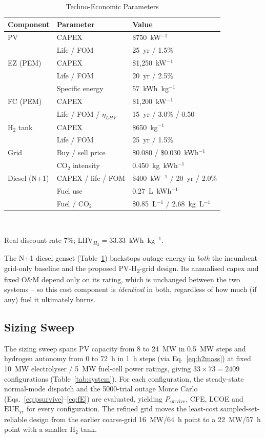 \documentclass[conference]{IEEEtran}
\begin{document}
\begin{table}[t]
\centering
\caption{Techno-Economic Parameters}
\label{tab:costs}
\scriptsize
\begin{tabular}{@{}lll@{}}
\toprule
Component & Parameter & Value \\
\midrule
PV & CAPEX & \$750~kW$^{-1}$ \\
 & Life / FOM & 25~yr / 1.5\% \\
EZ (PEM) & CAPEX & \$1{,}250~kW$^{-1}$ \\
 & Life / FOM & 20~yr / 2.5\% \\
 & Specific energy & 57~kWh~kg$^{-1}$ \\
FC (PEM) & CAPEX & \$1{,}200~kW$^{-1}$ \\
 & Life / FOM / $\eta_{LHV}$ & 15~yr / 3.0\% / 0.50 \\
H$_2$ tank & CAPEX & \$650~kg$^{-1}$ \\
 & Life / FOM & 25~yr / 1.5\% \\
Grid & Buy / sell price & \$0.080 / \$0.030~kWh$^{-1}$ \\
 & CO$_2$ intensity & 0.450~kg~kWh$^{-1}$ \\
Diesel (N+1) & CAPEX / life / FOM & \$400~kW$^{-1}$ / 20~yr / 2.0\% \\
 & Fuel use & 0.27~L~kWh$^{-1}$ \\
 & Fuel / CO$_2$ & \$0.85~L$^{-1}$ / 2.68~kg~L$^{-1}$ \\
\bottomrule
\end{tabular}
\\[2pt]
\raggedright\footnotesize Real discount rate 7\%; LHV$_{H_2}=33.33$~kWh~kg$^{-1}$.
\end{table}

The N+1 diesel genset (Table~\ref{tab:costs}) backstops outage energy in \emph{both} the incumbent grid-only baseline and the proposed PV-H\textsubscript{2}-grid design. Its annualised capex and fixed O\&M depend only on its rating, which is unchanged between the two systems -- so this cost component is \emph{identical} in both, regardless of how much (if any) fuel it ultimately burns.

\subsection{Sizing Sweep}
\label{sec:sweep}

The sizing sweep spans PV capacity from 8 to 24~MW in 0.5~MW steps and hydrogen autonomy from 0 to 72~h in 1~h steps (via Eq.~\ref{eq:h2mass}) at fixed 10~MW electrolyser / 5~MW fuel-cell power ratings, giving $33\times73=2409$ configurations (Table~\ref{tab:system}). For each configuration, the steady-state normal-mode dispatch and the 5000-trial outage Monte Carlo (Eqs.~\ref{eq:psurvive}--\ref{eq:fE}) are evaluated, yielding $P_{\mathrm{survive}}$, CFE, LCOE and $\mathrm{EUE}_{\mathrm{yr}}$ for every configuration. The refined grid moves the least-cost sampled-set-reliable design from the earlier coarse-grid 16~MW/64~h point to a 22~MW/57~h point with a smaller H$_2$ tank.
\end{document}
